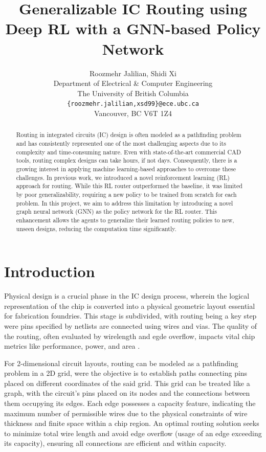\documentclass[letterpaper]{article}
\title{Generalizable IC Routing using Deep RL with a GNN-based Policy Network}
\author{%
    Roozmehr Jalilian, Shidi Xi \\
    Department of Electrical \& Computer Engineering \\
    The University of British Columbia \\
    \texttt{\{roozmehr.jalilian,xsd99\}@ece.ubc.ca} \\
    Vancouver, BC V6T 1Z4 }
\begin{document}
\maketitle


\begin{abstract}
Routing in integrated circuits (IC) design is often modeled as a pathfinding
problem and has consistently represented one of the most challenging aspects due
to its complexity and time-consuming nature. Even with state-of-the-art
commercial CAD tools, routing complex designs can take hours, if not days.
Consequently, there is a growing interest in applying machine learning-based
approaches to overcome these challenges. In previous work, we introduced a novel
reinforcement learning (RL) approach for routing. While this RL router
outperformed the baseline, it was limited by poor generalizability, requiring a
new policy to be trained from scratch for each problem. In this project, we aim
to address this limitation by introducing a novel graph neural network (GNN) as
the policy network for the RL router. This enhancement allows the agents to
generalize their learned routing policies to new, unseen designs, reducing the
computation time significantly.
\end{abstract}

\section{Introduction}
Physical design is a crucial phase in the IC design process, wherein the logical
representation of the chip is converted into a physical geometric layout
essential for fabrication foundries. This stage is subdivided, with routing
being a key step were pins specified by netlists are connected using wires and
vias. The quality of the routing, often evaluated by wirelength and egde
overflow, impacts vital chip metrics like performance, power, and area
\cite{Hu2001}.

For 2-dimensional circuit layouts, routing can be modeled as a pathfinding
problem in a 2D grid, were the objective is to establish paths connecting pins
placed on different coordinates of the said grid. This grid can be treated like
a graph, with the circuit's pins placed on its nodes and the connections between
them occupying its edges. Each edge possesses a capacity feature, indicating the
maximum number of permissible wires due to the physical constraints of wire
thickness and finite space within a chip region. An optimal routing solution
seeks to minimize total wire length and avoid edge overflow (usage of an edge
exceeding its capacity), ensuring all connections are efficient and within
capacity.
\end{document}
